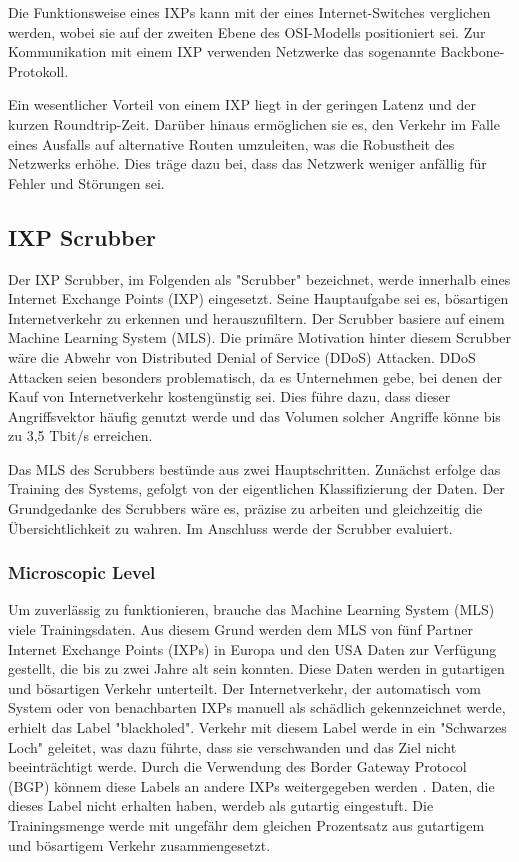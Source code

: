 \documentclass[sigplan,screen]{acmart}
\begin{document}
Die Funktionsweise eines IXPs kann mit der eines Internet-Switches verglichen werden, wobei sie auf der zweiten Ebene des OSI-Modells positioniert sei. Zur Kommunikation mit einem IXP verwenden Netzwerke das sogenannte Backbone-Protokoll.

Ein wesentlicher Vorteil von einem IXP liegt in der geringen Latenz und der kurzen Roundtrip-Zeit. Darüber hinaus ermöglichen sie es, den Verkehr im Falle eines Ausfalls auf alternative Routen umzuleiten, was die Robustheit des Netzwerks erhöhe. Dies träge dazu bei, dass das Netzwerk weniger anfällig für Fehler und Störungen sei. \cite{ixp00}

\subsection{IXP Scrubber}
Der IXP Scrubber, im Folgenden als "Scrubber" bezeichnet, werde innerhalb eines Internet Exchange Points (IXP) eingesetzt. Seine Hauptaufgabe sei es, bösartigen Internetverkehr zu erkennen und herauszufiltern. Der Scrubber basiere auf einem Machine Learning System (MLS). Die primäre Motivation hinter diesem Scrubber wäre die Abwehr von Distributed Denial of Service (DDoS) Attacken. DDoS Attacken seien besonders problematisch, da es Unternehmen gebe, bei denen der Kauf von Internetverkehr kostengünstig sei. Dies führe dazu, dass dieser Angriffsvektor häufig genutzt werde und das Volumen solcher Angriffe könne bis zu 3,5 Tbit/s erreichen.

Das MLS des Scrubbers bestünde aus zwei Hauptschritten. Zunächst erfolge das Training des Systems, gefolgt von der eigentlichen Klassifizierung der Daten. Der Grundgedanke des Scrubbers wäre es, präzise zu arbeiten und gleichzeitig die Übersichtlichkeit zu wahren. Im Anschluss werde der Scrubber evaluiert.

\subsubsection{Microscopic Level}
Um zuverlässig zu funktionieren, brauche das Machine Learning System (MLS) viele Trainingsdaten. Aus diesem Grund werden dem MLS von fünf Partner Internet Exchange Points (IXPs) in Europa und den USA Daten zur Verfügung gestellt, die bis zu zwei Jahre alt sein konnten. Diese Daten werden in gutartigen und bösartigen Verkehr unterteilt. Der Internetverkehr, der automatisch vom System oder von benachbarten IXPs manuell als schädlich gekennzeichnet werde, erhielt das Label "blackholed". Verkehr mit diesem Label werde in ein "Schwarzes Loch" geleitet, was dazu führte, dass sie verschwanden und das Ziel nicht beeinträchtigt werde. Durch die Verwendung des Border Gateway Protocol (BGP) könnem diese Labels an andere IXPs weitergegeben werden \cite{blackhole00}. 
Daten, die dieses Label nicht erhalten haben, werdeb als gutartig eingestuft. Die Trainingsmenge werde mit ungefähr dem gleichen Prozentsatz aus gutartigem und bösartigem Verkehr zusammengesetzt.
\end{document}
